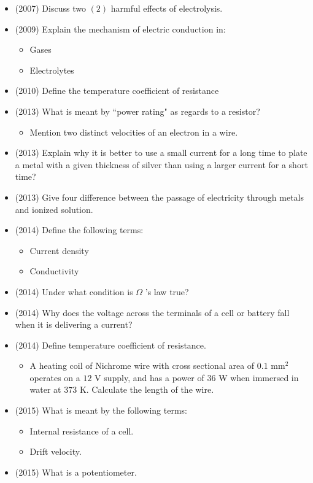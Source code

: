 \documentclass{article}
\begin{document}
\begin{itemize}
\item (2007)  Discuss two $ (2)$ harmful effects of electrolysis. 
\item (2009)  Explain the mechanism of electric conduction in:\begin{itemize}
\item Gases
\item Electrolytes
\end{itemize}
\item (2010)  Define the temperature coefficient of resistance
\item (2013)  What is meant by “power rating" as regards to a resistor?\begin{itemize}
\item Mention two distinct velocities of an electron in a wire.
\end{itemize}
\item (2013)  Explain why it is better to use a small current for a long time to plate a metal with a given thickness of silver than using a larger current for a short time? 
\item (2013)  Give four difference between the passage of electricity through metals and  ionized solution.
\item (2014)  Define the following terms:\begin{itemize}
\item Current density
\item Conductivity 
\end{itemize}
\item (2014)  Under what condition is $ \Omega $ ’s law true?
\item (2014)  Why does the voltage across the terminals of a cell or battery fall when it is delivering a current? 
\item (2014)  Define temperature coefficient of resistance.\begin{itemize}
\item A heating coil of Nichrome wire with cross sectional area of $ 0.1 $ mm$ ^{2}$ operates on a $ 12$ V supply, and has a power of $ 36$ W when immersed in water at $ 373$ K. Calculate the length of the wire.
\end{itemize}
\item (2015)  What is meant by the following terms:\begin{itemize}
\item  Internal resistance of a cell. 
\item  Drift velocity. 
\end{itemize}
\item (2015)  What is a potentiometer. \begin{itemize}

\end{itemize}
\end{itemize}
\end{document}
